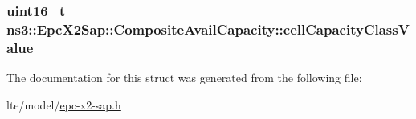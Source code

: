 \subsubsection[{\texorpdfstring{cell\+Capacity\+Class\+Value}{cellCapacityClassValue}}]{\setlength{\rightskip}{0pt plus 5cm}uint16\+\_\+t ns3\+::\+Epc\+X2\+Sap\+::\+Composite\+Avail\+Capacity\+::cell\+Capacity\+Class\+Value}\hypertarget{structns3_1_1EpcX2Sap_1_1CompositeAvailCapacity_a5c7d063c912541effd7a3e0e8c6c14e8}{}\label{structns3_1_1EpcX2Sap_1_1CompositeAvailCapacity_a5c7d063c912541effd7a3e0e8c6c14e8}


The documentation for this struct was generated from the following file\+:\begin{DoxyCompactItemize}
\item 
lte/model/\hyperlink{epc-x2-sap_8h}{epc-\/x2-\/sap.\+h}\end{DoxyCompactItemize}
